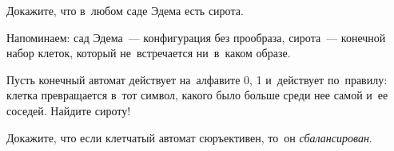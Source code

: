 \begin{problems}
\item
Докажите, что в~любом саде Эдема есть сирота.
\par
Напоминаем:
сад Эдема~--- конфигурация без прообраза,
сирота~--- конечной набор клеток, который не~встречается ни~в~каком образе.

\item
Пусть конечный автомат действует на~алфавите 0, 1 и~действует по~правилу:
клетка превращается в~тот символ, какого было больше среди нее самой и~ее
соседей.
Найдите сироту!

\item
Докажите, что если клетчатый автомат сюръективен, то~он \emph{сбалансирован}.

\end{problems}

